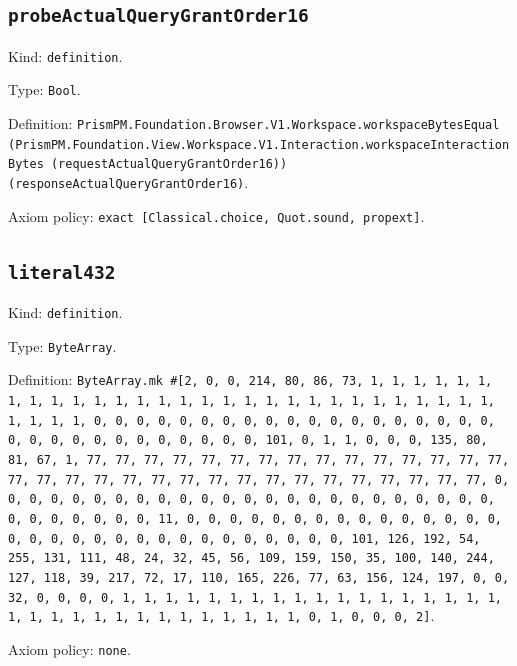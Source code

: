 \documentclass[11pt]{article}
\begin{document}
\subsection*{\texttt{probeActualQueryGrantOrder16}}
\noindent Kind: \texttt{definition}.\par
\noindent Type: \texttt{Bool}.\par
\noindent Definition: \texttt{PrismPM.Foundation.Browser.V1.Workspace.workspaceBytesEqual (PrismPM.Foundation.View.Workspace.V1.Interaction.workspaceInteractionBytes (requestActualQueryGrantOrder16)) (responseActualQueryGrantOrder16)}.\par
\noindent Axiom policy: \texttt{exact [Classical.choice, Quot.sound, propext]}.\par
\subsection*{\texttt{literal432}}
\noindent Kind: \texttt{definition}.\par
\noindent Type: \texttt{ByteArray}.\par
\noindent Definition: \texttt{ByteArray.mk \#[2, 0, 0, 214, 80, 86, 73, 1, 1, 1, 1, 1, 1, 1, 1, 1, 1, 1, 1, 1, 1, 1, 1, 1, 1, 1, 1, 1, 1, 1, 1, 1, 1, 1, 1, 1, 1, 1, 1, 1, 0, 0, 0, 0, 0, 0, 0, 0, 0, 0, 0, 0, 0, 0, 0, 0, 0, 0, 0, 0, 0, 0, 0, 0, 0, 0, 0, 0, 0, 0, 0, 101, 0, 1, 1, 0, 0, 0, 135, 80, 81, 67, 1, 77, 77, 77, 77, 77, 77, 77, 77, 77, 77, 77, 77, 77, 77, 77, 77, 77, 77, 77, 77, 77, 77, 77, 77, 77, 77, 77, 77, 77, 77, 77, 77, 0, 0, 0, 0, 0, 0, 0, 0, 0, 0, 0, 0, 0, 0, 0, 0, 0, 0, 0, 0, 0, 0, 0, 0, 0, 0, 0, 0, 0, 0, 0, 11, 0, 0, 0, 0, 0, 0, 0, 0, 0, 0, 0, 0, 0, 0, 0, 0, 0, 0, 0, 0, 0, 0, 0, 0, 0, 0, 0, 0, 0, 0, 0, 101, 126, 192, 54, 255, 131, 111, 48, 24, 32, 45, 56, 109, 159, 150, 35, 100, 140, 244, 127, 118, 39, 217, 72, 17, 110, 165, 226, 77, 63, 156, 124, 197, 0, 0, 32, 0, 0, 0, 0, 1, 1, 1, 1, 1, 1, 1, 1, 1, 1, 1, 1, 1, 1, 1, 1, 1, 1, 1, 1, 1, 1, 1, 1, 1, 1, 1, 1, 1, 1, 1, 1, 0, 1, 0, 0, 0, 2]}.\par
\noindent Axiom policy: \texttt{none}.\par
\end{document}
